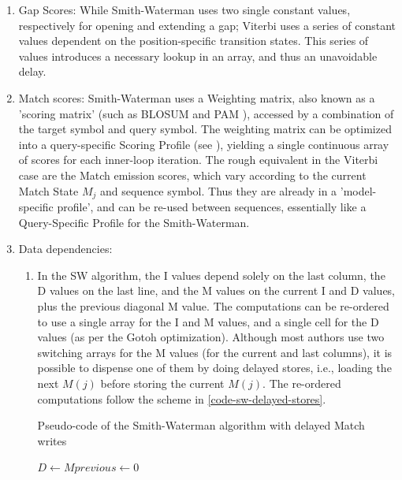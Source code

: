 \begin{enumerate}

\item Gap Scores: While Smith-Waterman uses two single constant values, respectively for opening and extending a gap; Viterbi uses a series of constant values dependent on the position-specific transition states. This series of values introduces a necessary lookup in an array, and thus an unavoidable delay.


\item Match scores: Smith-Waterman uses a Weighting matrix, also known as a 'scoring matrix' (such as BLOSUM \cite{blosum} and PAM \cite{pam}), accessed by a combination of the target symbol and query symbol. The weighting matrix can be optimized into a query-specific Scoring Profile (see ), yielding a single continuous array of scores for each inner-loop iteration.
	The rough equivalent in the Viterbi case are the Match emission scores, which vary according to the current Match State $M_j$ and sequence symbol. Thus they are already in a 'model-specific profile', and can be re-used between sequences, essentially like a Query-Specific Profile for the Smith-Waterman.


\item Data dependencies:
\begin{enumerate}
\item In the SW algorithm, the I values depend solely on the last column, the D values on the last line, and the M values on the current I and D values, plus the previous diagonal M value. The computations can be re-ordered to use a single array for the I and M values, and a single cell for the D values (as per the Gotoh optimization). Although most authors use two switching arrays for the M values (for the current and last columns), it is possible to dispense one of them by doing delayed stores, i.e., loading the next $M(j)$ before storing the current $M(j)$. The re-ordered computations follow the scheme in \cref{code-sw-delayed-stores}.


\begin{algorithm}[htb!]
\caption[Smith-Waterman pseudo-code with delayed Match writes] {Pseudo-code of the Smith-Waterman algorithm with delayed Match writes}
\label{code-sw-delayed-stores}

\begin{algorithmic}


	\State	 $ D \gets Mprevious \gets 0 $


\end{algorithmic}
\end{algorithm}
\end{enumerate}
\end{enumerate}
